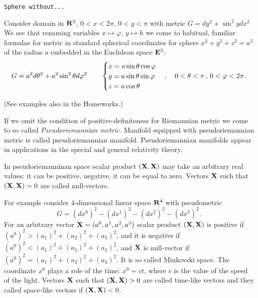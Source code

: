 \documentclass[12pt]{article}
\theoremstyle{theorem}
\numberwithin{equation}{section}
\begin{document}
\begin{itemize}
{\footnotesize
 \item  {\tt Sphere without...}

   Consider domain in ${\bf R}^2$,  $0<x<2\pi$, $0<y<\pi$ 
with metric $G=dy^2+\sin^2 y dx^2$
We see that renaming variables $x\mapsto \varphi $, $y\mapsto h$ we come to habitual, familiar formulae for
metric in standard spherical coordinates
for sphere $x^2+y^2+z^2=a^2$ of the radius $a$ embedded in the Euclidean space ${\bf E}^3$:
           \begin{equation}\label{domainascylinder2}
          G= a^2d\theta^2+a^2\sin^2\theta
          d\varphi^2\qquad
          \begin{cases}
          x=a\sin\theta\cos\varphi\cr
          y=a\sin\theta\sin\varphi\cr
          z=a\cos\theta\cr
          \end {cases},
      \quad 0<\theta<\pi\,,\,
          0< \varphi <2\pi\,.
           \end{equation}

}
\end{itemize}

		   (See examples also in the Homeworks.)


{\footnotesize If we omit the
condition of positive-definiteness for Riemannian metric we come to so
called  {\it Pseudoriemannian metric}.
Manifold equipped with pseudoriemannian metric is called
pseudoriemannian manifold.  Pseudoriemannian manifolds
appear in applications in the special and general
relativity theory.

In pseudoriemanninan space scalar product $({\bf X},{\bf X})$ may take an arbitrary real
values: it can be positive, negative, it can be equal to zero. Vectors
${\bf X}$ such that $({\bf X},{\bf X})=0$ are called null-vectors.


For example consider $4$-dimensional
linear space ${\bf R}^4$ with pseudometric
           $$
    G=(dx^0)^2-(dx^1)^2-(dx^2)^2-(dx^3)^2\,.
            $$
 For an arbitrary vector ${\bf X}=(a^0,a^1,a^2,a^3)$
scalar product $({\bf X},{\bf X})$ is positive if
$(a^0)^2>(a_1)^2+(a_2)^2+(a_3)^2$, and it is negative if
$(a^0)^2<(a_1)^2+(a_2)^2+(a_3)^2$, and
${\bf X}$ is null-vector if  $(a^0)^2=(a_1)^2+(a_2)^2+(a_3)^2$.
It is so called Minkovski space.
The coordinate $x^0$ plays a
role of the time: $x^0=ct$, where $c$ is
the value of the speed of the light. 
Vectors ${\bf X}$ such that $({\bf X},{\bf X})>0$
are called time-like vectors and they called space-like vectors
if $({\bf X},{\bf X})<0$.} 





\end{document}
